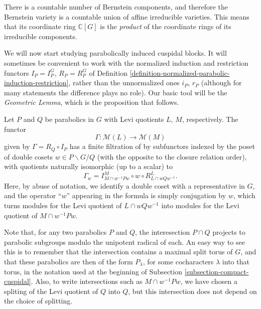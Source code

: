 There is a countable number of Bernstein components, and therefore the Bernstein variety is a countable union of affine irreducible varieties. This means that its coordinate ring $\mathbb C[G]$ is the \emph{product} of the coordinate rings of its irreducible components. 


We will now start studying parabolically induced cuspidal blocks. It will sometimes be convenient to work with the normalized induction and restriction functors $I_P=I_P^G$, $R_P=R_P^G$ of Definition \ref{definition-normalized-parabolic-induction-restriction}, rather than the unnormalized ones $i_P$, $r_P$ (although for many statements the difference plays no role). Our basic tool will be the {\it Geometric Lemma}, which is the proposition that follows.

\begin{proposition}
	\label{proposition-geometric-lemma}
Let $P$ and $Q$ be parabolics in $G$ with Levi quotients $L$, $M$, respectively. The functor
$$\Gamma: \mathcal M(L) \to \mathcal M(M)$$
given by $\Gamma = R_Q \circ I_P$ has a finite filtration of by subfunctors indexed by the poset of double cosets $w\in P\backslash G/Q$ (with the opposite to the closure relation order), with quotients naturally isomorphic (up to a scalar) to
$$ \Gamma_w = I^M_{M\cap w^{-1}Pw} \circ w \circ R^L_{L\cap wQw^{-1}}.$$
Here, by abuse of notation, we identify a double coset with a representative in $G$, and the operator ``$w$'' appearing in the formula is simply conjugation by $w$, which turns modules for the Levi quotient of $L\cap wQw^{-1}$ into modules for the Levi quotient of $M\cap w^{-1}Pw$.
\end{proposition}

Note that, for any two parabolics $P$ and $Q$, the interesection $P\cap Q$ projects to parabolic subgroups modulo the unipotent radical of each. An easy way to see this is to remember that the intersection contains a maximal split torus of $G$, and that these parabolics are then of the form $P_\lambda$, for some cocharacters $\lambda$ into that torus, in the notation used at the beginning of Subsection \ref{subsection-compact-cuspidal}. Also, to write intersections such as $M\cap w^{-1}Pw$, we have chosen a spliting of the Levi quotient of $Q$ into $Q$, but this intersection does not depend on the choice of splitting.

